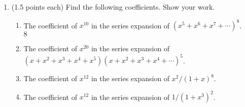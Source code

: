 \documentclass[11pt]{article}
\begin{document}
\begin{enumerate}
\begin{enumerate}
\end{enumerate}

\item (1.5 points each) Find the following coefficients.  Show your work.
\begin{enumerate}
\item The coefficient of $x^{10}$ in the series expansion of 
$(x^5+x^6 + x^7+ \cdots)^8$.\\
$8$
\item The coefficient of $x^{20}$ in the series expansion of 
$(x+x^2 + x^3+x^4+x^5) (x+x^2 + x^3+x^4+\cdots)^5 $.
\item The coefficient of $x^{12}$ in the series expansion of
$x^2/(1+x)^8$.
\item The coefficient of $x^{12}$ in the series expansion of
$1/(1+x^3)^2$.
\end{enumerate}

\end{enumerate}
\end{document}
